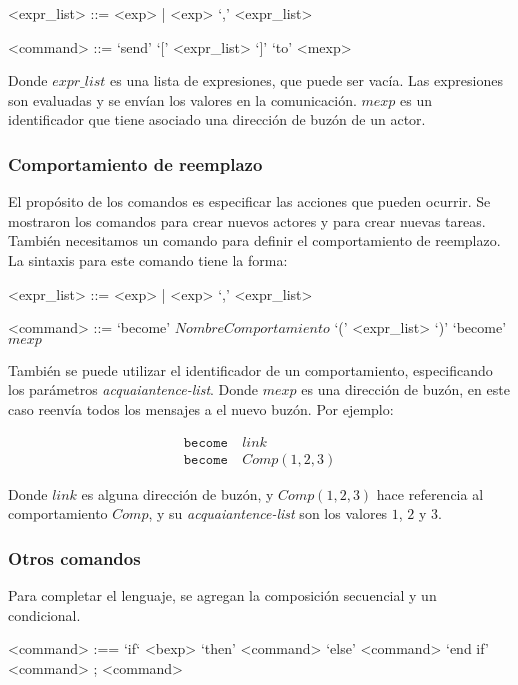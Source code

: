 \begin{grammar}
  <expr_list> ::= <exp> | <exp> `,' <expr_list>  

  <command> ::= `send' `[' <expr_list> `]' `to' <mexp>  
\end{grammar}

Donde $expr\_list$ es una lista de expresiones, que puede ser vacía. Las expresiones son evaluadas y se envían los valores en la comunicación. $mexp$ es un identificador que tiene asociado una dirección de buzón de un actor. 

\subsubsection*{Comportamiento de reemplazo}

El propósito de los comandos es especificar las acciones que pueden ocurrir. Se mostraron los comandos para crear nuevos actores y para crear nuevas tareas. También necesitamos un comando para definir el comportamiento de reemplazo. La sintaxis para este comando tiene la forma:

\begin{grammar}
  <expr_list> ::= <exp> | <exp> `,' <expr_list>  

  <command> ::= `become' $NombreComportamiento$ `(' <expr_list> `)'
  \alt `become' $mexp$
\end{grammar}

También se puede utilizar el identificador de un comportamiento, especificando los parámetros \textit{acquaiantence-list}. Donde $mexp$ es una dirección de buzón, en este caso reenvía todos los mensajes a el nuevo buzón.  Por ejemplo:

\begin{align*}
 \texttt{become}&\ link \\
 \texttt{become}&\ Comp(1,2,3) 
\end{align*}

Donde $link$ es alguna dirección de buzón, y $Comp(1,2,3)$ hace referencia al comportamiento $Comp$, y su \textit{acquaiantence-list} son los valores $1$, $2$ y $3$.


\subsubsection*{Otros comandos}

Para completar el lenguaje, se agregan la composición secuencial y un condicional.

\begin{grammar}
  <command> :== `if` <bexp> `then' <command> `else' <command> `end if'
  \alt <command> ; <command>
\end{grammar}

